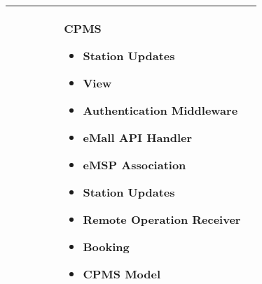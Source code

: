 {\begin{longtable}{|p{0.20\linewidth}p{0.75\linewidth}|}
    \hline
    \rowcolor{bluepoli!5}  & CPMS  \newline
    \begin{itemize}
        \item Station Updates
        \item View
        \item Authentication Middleware
        \item eMall API Handler
        \item eMSP Association
        \item Station Updates
        \item Remote Operation Receiver
        \item Booking
        \item CPMS Model
    \end{itemize} \\
    \hline
\end{longtable}}
\newpage
